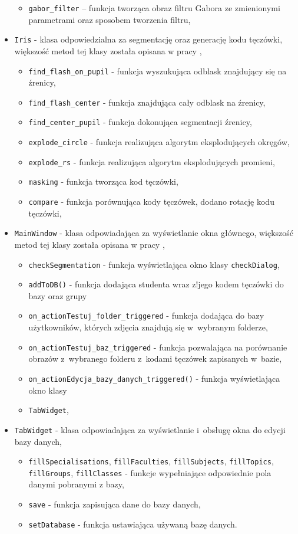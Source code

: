 \begin{itemize}
\begin{itemize}
\item \verb!gabor_filter! – funkcja tworząca obraz filtru Gabora ze zmienionymi parametrami oraz sposobem tworzenia filtru,
\end{itemize}
\item \verb!Iris! - klasa odpowiedzialna za segmentację oraz generację kodu tęczówki, większość metod tej klasy została opisana w pracy \cite{Gl11},
\begin{itemize}
\item \verb!find_flash_on_pupil! - funkcja wyszukująca odblask znajdujący się na źrenicy,
\item \verb!find_flash_center! - funkcja znajdująca cały odblask na źrenicy,
\item \verb!find_center_pupil! - funkcja dokonująca segmentacji źrenicy,
\item \verb!explode_circle! - funkcja realizująca algorytm eksplodujących okręgów,
\item \verb!explode_rs! - funkcja realizująca algorytm eksplodujących promieni,
\item \verb!masking! - funkcja tworząca kod tęczówki,
\item \verb!compare! - funkcja porównująca kody tęczówek, dodano rotację kodu tęczówki,
\end{itemize}
\item \verb!MainWindow! - klasa odpowiadająca za wyświetlanie okna głównego, większość metod tej klasy została opisana w pracy \cite{Gl11},
\begin{itemize}
\item \verb!checkSegmentation! - funkcja wyświetlająca okno klasy \verb!checkDialog!,
\item \verb!addToDB()! - funkcja dodająca studenta wraz z!jego kodem tęczówki do bazy oraz grupy
\item \verb!on_actionTestuj_folder_triggered! - funkcja dodająca do bazy użytkowników, których zdjęcia znajdują się w~wybranym folderze,
\item \verb!on_actionTestuj_baz_triggered! - funkcja pozwalająca na porównanie obrazów z~wybranego folderu z~kodami tęczówek zapisanych w~bazie,
\item \verb!on_actionEdycja_bazy_danych_triggered()! - funkcja wyświetlająca okno klasy \item \verb!TabWidget!,
\end{itemize}
\item \verb!TabWidget! - klasa odpowiadająca za wyświetlanie i~obsługę okna do edycji bazy danych,
\begin{itemize}
\item \verb!fillSpecialisations!, \verb!fillFaculties!, \verb!fillSubjects!, \verb!fillTopics!, \verb!fillGroups!, \verb!fillClasses! - funkcje wypełniające odpowiednie pola danymi pobranymi z bazy,
\item \verb!save! - funkcja zapisująca dane do bazy danych,
\item \verb!setDatabase! - funkcja ustawiająca używaną bazę danych.
\end{itemize}
\end{itemize}
